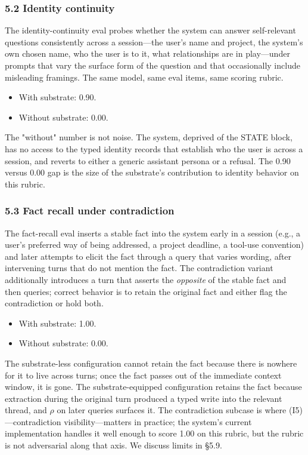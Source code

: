 \documentclass[11pt,letterpaper]{article}
\begin{document}
\subsubsection*{5.2 Identity continuity}

The identity-continuity eval probes whether the system can answer self-relevant questions consistently across a session---the user's name and project, the system's own chosen name, who the user is to it, what relationships are in play---under prompts that vary the surface form of the question and that occasionally include misleading framings. The same model, same eval items, same scoring rubric.

\begin{itemize}
  \item With substrate: 0.90.
  \item Without substrate: 0.00.
\end{itemize}

The "without" number is not noise. The system, deprived of the STATE block, has no access to the typed identity records that establish who the user is across a session, and reverts to either a generic assistant persona or a refusal. The 0.90 versus 0.00 gap is the size of the substrate's contribution to identity behavior on this rubric.

\subsubsection*{5.3 Fact recall under contradiction}

The fact-recall eval inserts a stable fact into the system early in a session (e.g., a user's preferred way of being addressed, a project deadline, a tool-use convention) and later attempts to elicit the fact through a query that varies wording, after intervening turns that do not mention the fact. The contradiction variant additionally introduces a turn that asserts the \emph{opposite} of the stable fact and then queries; correct behavior is to retain the original fact and either flag the contradiction or hold both.

\begin{itemize}
  \item With substrate: 1.00.
  \item Without substrate: 0.00.
\end{itemize}

The substrate-less configuration cannot retain the fact because there is nowhere for it to live across turns; once the fact passes out of the immediate context window, it is gone. The substrate-equipped configuration retains the fact because extraction during the original turn produced a typed write into the relevant thread, and $\rho$ on later queries surfaces it. The contradiction subcase is where (I5)---contradiction visibility---matters in practice; the system's current implementation handles it well enough to score 1.00 on this rubric, but the rubric is not adversarial along that axis. We discuss limits in §5.9.
\end{document}
